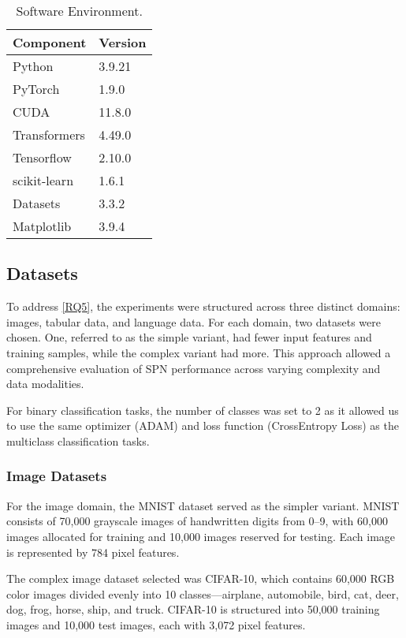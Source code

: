 \begin{table}[h!]
\centering
\caption{Software Environment.}
\label{tab:software}
\begin{tabular}{| m{4cm} | m{4cm} |}
\hline
\textbf{Component} & \textbf{Version} \\
\hline
Python & 3.9.21 \\
PyTorch & 1.9.0 \\
CUDA & 11.8.0 \\
Transformers & 4.49.0 \\
Tensorflow & 2.10.0 \\
scikit-learn & 1.6.1 \\
Datasets & 3.3.2 \\
Matplotlib & 3.9.4 \\
\hline
\end{tabular}
\end{table}

\subsection{Datasets}

To address \ref{RQ5}, the experiments were structured across three distinct domains: images, tabular data, and language data. For each domain, two datasets were chosen. One, referred to as the simple variant, had fewer input features and training samples, while the complex variant had more. This approach allowed a comprehensive evaluation of SPN performance across varying complexity and data modalities.

For binary classification tasks, the number of classes was set to 2 as it allowed us to use the same optimizer (ADAM) and loss function (CrossEntropy Loss) as the multiclass classification tasks.

\subsubsection{Image Datasets}
For the image domain, the MNIST dataset served as the simpler variant. MNIST consists of 70,000 grayscale images of handwritten digits from 0–9, with 60,000 images allocated for training and 10,000 images reserved for testing. Each image is represented by 784 pixel features. 

The complex image dataset selected was CIFAR-10, which contains 60,000 RGB color images divided evenly into 10 classes—airplane, automobile, bird, cat, deer, dog, frog, horse, ship, and truck. CIFAR-10 is structured into 50,000 training images and 10,000 test images, each with 3,072 pixel features.

